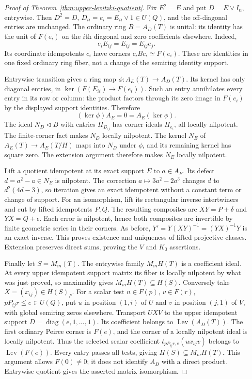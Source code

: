 \begin{proof}[Proof of Theorem~\ref{thm:upper-levitzki-quotient}]
Fix $E^2=E$ and put $D=E\vee I_n$, entrywise. Then $D^2=D$,
$D_{ii}=e_i=E_{ii}\vee1\in U(Q)$, and the off-diagonal entries are
unchanged. The ordinary ring $B=A_D(T)$ is unital: its identity has
the unit of $F(e_i)$ on the $i$th diagonal and zero coefficients
elsewhere. Indeed,
\[
 e_iE_{ij}=E_{ij}=E_{ij}e_j.
\]
Its coordinate idempotents $c_i$ have corners
$c_iBc_i\simeq F(e_i)$. These are identities in one fixed ordinary
ring fiber, not a change of the semiring identity support.

Entrywise transition gives a ring map
$\phi:A_E(T)\to A_D(T)$. Its kernel has only diagonal entries, in
$\ker(F(E_{ii})\to F(e_i))$. Such an entry annihilates every entry
in its row or column: the product factors through its zero image in
$F(e_i)$ by the displayed support identities. Therefore
\[
 (\ker\phi)A_E=0=A_E(\ker\phi).
\]
The ideal $N_D\lhd B$ with entries $H_{D_{ij}}$ has corner ideals
$H_{e_i}$, all locally nilpotent. The finite-corner fact makes $N_D$
locally nilpotent. The kernel $N_E$ of $A_E(T)\to A_E(T/H)$ maps
into $N_D$ under $\phi$, and its remaining kernel has square zero.
The extension argument therefore makes $N_E$ locally nilpotent.

Lift a quotient idempotent at its exact support $E$ to $a\in A_E$.
Its defect $d=a^2-a\in N_E$ is nilpotent. The correction
$a\mapsto3a^2-2a^3$ changes $d$ to $d^2(4d-3)$, so iteration gives
an exact idempotent without a constant term or change of support.
For an isomorphism, lift its rectangular inverse intertwiners and cut
by lifted idempotents $P,Q$. The resulting composites are
$XY=P+\delta$ and $YX=Q+\epsilon$. Each error is nilpotent, hence
both composites are invertible by finite geometric series in their
corners. As before, $Y'=Y(XY)^{-1}=(YX)^{-1}Y$ is an exact inverse.
This proves existence and uniqueness of lifted projective classes.
Extension preserves direct sums, proving the $V$ and $K_0$ assertions.

Finally let $S=M_m(T)$. The entrywise family $M_mH(T)$ is a
coefficient ideal. At every upper idempotent support matrix its fiber
is locally nilpotent by what was just proved, so maximality gives
$M_mH(T)\subseteq H(S)$. Conversely take $X=(x_{ij})\in H(S)_P$.
For a scalar test $u\in F(p)$, $v\in F(r)$,
$pP_{ij}r\leq e\in U(Q)$, put $u$ in position $(1,i)$ of $U$ and
$v$ in position $(j,1)$ of $V$, with global semiring zeros elsewhere.
Transport $UXV$ to the upper idempotent support
$D=\operatorname{diag}(e,1,\ldots,1)$. Its coefficient belongs to
$\operatorname{Lev}(A_D(T))$. The first ordinary Peirce corner is
$F(e)$, and the corner of a locally nilpotent ideal is locally
nilpotent. Thus the selected scalar coefficient
$t_{pP_{ij}r,e}(ux_{ij}v)$ belongs to $\operatorname{Lev}(F(e))$.
Every entry passes all tests, giving $H(S)\subseteq M_mH(T)$.
This argument allows $F(0)\ne0$; it does not identify $A_D$ with a
direct product. Entrywise quotient gives the asserted matrix
isomorphism.
\end{proof}

